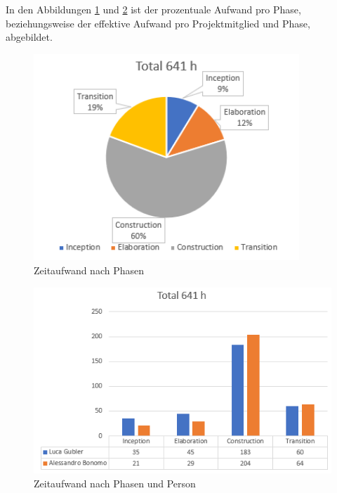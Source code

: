In den Abbildungen \ref{time_per_phase} und \ref{time_per_phase_and_person} ist der prozentuale Aufwand pro Phase, beziehungsweise der effektive Aufwand pro Projektmitglied und Phase, abgebildet.

\begin{minipage}{\textwidth}
	\begin{figure}[H]
		\includegraphics[width=10cm, height=\textheight, keepaspectratio]{images/Zeitauswertung/Prozentualer_Aufwand_Phasen.png}
		\caption{Zeitaufwand nach Phasen}
		\label{time_per_phase}
	\end{figure}
\end{minipage}

\begin{minipage}{\textwidth}
	\begin{figure}[H]
		\includegraphics[width=\textwidth, height=\textheight, keepaspectratio]{images/Zeitauswertung/Prozentualer_Aufwand_Phasen_Effektiv.png}
		\caption{Zeitaufwand nach Phasen und Person}
		\label{time_per_phase_and_person}
	\end{figure}
\end{minipage}

